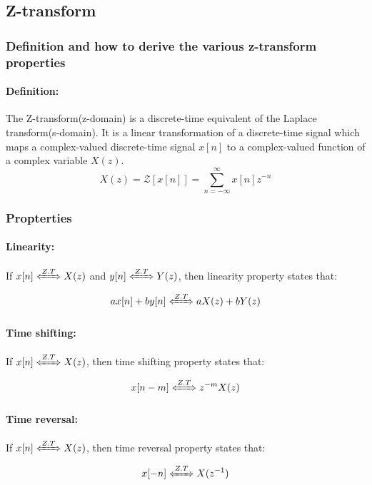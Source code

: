\documentclass{article}
\begin{document}
\subsection{Z-transform}

\subsubsection{Definition and how to derive the various z-transform properties}
\paragraph{Definition:}
The Z-transform(z-domain) is a discrete-time equivalent of the Laplace transform(s-domain). It is a linear transformation of a discrete-time signal which maps a complex-valued discrete-time signal $x[n]$ to a complex-valued function of a complex variable $X(z)$.
\begin{equation}
    X(z) = \mathcal{Z}[x[n]] = \sum_{n=-\infty}^{\infty} x[n]z^{-n}
\end{equation}

\subsubsection*{Propterties}

\paragraph{Linearity:}
If $x[n] \xLeftrightarrow{Z.T} X(z)$ and $y[n] \xLeftrightarrow{Z.T} Y(z)$, then linearity property states that:
\begin{equation}
    ax[n] + by[n] \xLeftrightarrow{Z.T}  aX(z) + bY(z)
\end{equation}

\paragraph{Time shifting:}
If $x[n] \xLeftrightarrow{Z.T} X(z)$, then time shifting property states that:
\begin{equation}
    x[n-m] \xLeftrightarrow{Z.T} z^{-m}X(z)
\end{equation}

\paragraph{Time reversal:}
If $x[n] \xLeftrightarrow{Z.T} X(z)$, then time reversal property states that:
\begin{equation}
    x[-n] \xLeftrightarrow{Z.T} X(z^{-1})
\end{equation}
\end{document}
